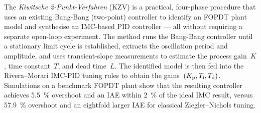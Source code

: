 The \emph{Kiwitsche 2-Punkt-Verfahren} (KZV) is a practical, four-phase
procedure that uses an existing Bang-Bang (two-point) controller to identify an
FOPDT plant model and synthesise an IMC-based PID controller --- all without
requiring a separate open-loop experiment.
The method runs the Bang-Bang controller until a stationary limit cycle is
established, extracts the oscillation period and amplitude, and uses
transient-slope measurements to estimate the process gain~$K$, time
constant~$T$, and dead time~$L$.
The identified model is then fed into the Rivera--Morari IMC-PID tuning rules
to obtain the gains~$(K_{\mathrm{p}}, T_{\mathrm{i}}, T_{\mathrm{d}})$.
Simulations on a benchmark FOPDT plant show that the resulting controller
achieves \SI{5.5}{\percent} overshoot and an IAE within \SI{2}{\percent} of the
ideal IMC result, versus \SI{57.9}{\percent} overshoot and an eightfold larger
IAE for classical Ziegler--Nichols tuning.
